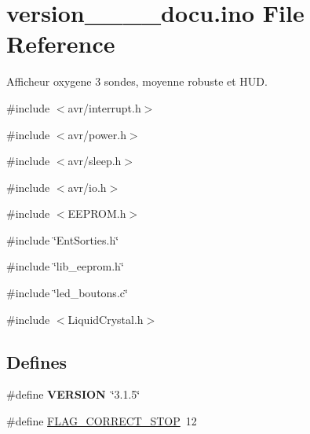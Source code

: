 \hypertarget{version__3__1__5__docu_8ino}{
\section{version\_\_\_\_\-docu.ino File Reference}
\label{version__3__1__5__docu_8ino}
}


Afficheur oxygene 3 sondes, moyenne robuste et HUD.  


{\ttfamily \#include $<$avr/interrupt.h$>$}\par
{\ttfamily \#include $<$avr/power.h$>$}\par
{\ttfamily \#include $<$avr/sleep.h$>$}\par
{\ttfamily \#include $<$avr/io.h$>$}\par
{\ttfamily \#include $<$EEPROM.h$>$}\par
{\ttfamily \#include \char`\"{}EntSorties.h\char`\"{}}\par
{\ttfamily \#include \char`\"{}lib\_\-eeprom.h\char`\"{}}\par
{\ttfamily \#include \char`\"{}led\_\-boutons.c\char`\"{}}\par
{\ttfamily \#include $<$LiquidCrystal.h$>$}\par
\subsection*{Defines}
\begin{DoxyCompactItemize}
\item 
\hypertarget{version__3__1__5__docu_8ino_a1c6d5de492ac61ad29aec7aa9a436bbf}{
\#define {\bfseries VERSION}~\char`\"{}3.1.5\char`\"{}}
\label{version__3__1__5__docu_8ino_a1c6d5de492ac61ad29aec7aa9a436bbf}

\item 
\#define \hyperlink{version__3__1__5__docu_8ino_a6a814c1adb22201ef288b62688eb31d8}{FLAG\_\-CORRECT\_\-STOP}~12
\end{DoxyCompactItemize}
